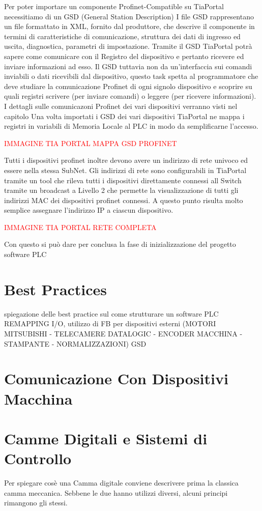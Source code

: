 \documentclass[12pt, a4paper, oneside]{book}
\begin{document}
	Per poter importare un componente Profinet-Compatible su TiaPortal necessitiamo di un GSD (General Station Description) 
	I file GSD rappresentano un file formattato in XML, fornito dal produttore, che descrive il componente in termini di caratteristiche di comunicazione, struttura dei dati di ingresso ed uscita, diagnostica, parametri di impostazione. Tramite il GSD TiaPortal potrà sapere come comunicare con il Registro del dispositivo e pertanto ricevere ed inviare informazioni ad esso. Il GSD tuttavia non da un'interfaccia sui comandi inviabili o dati ricevibili dal dispositivo, questo task spetta al programmatore che deve studiare la comunicazione Profinet di ogni signolo dispositivo e scoprire su quali registri scrivere (per inviare comandi) o leggere (per ricevere informazioni). I dettagli sulle comunicazoni Profinet dei vari dispositivi verranno visti nel capitolo \cite{profinet}
	Una volta importati i GSD dei vari dispositivi TiaPortal ne mappa i registri in variabili di Memoria Locale al PLC in modo da semplificarne l'accesso. 
	
	\textcolor{red}{IMMAGINE TIA PORTAL MAPPA GSD PROFINET}
	
	Tutti i dispositivi profinet inoltre devono avere un indirizzo di rete univoco ed essere nella stessa SubNet. Gli indirizzi di rete sono configurabili in TiaPortal tramite un tool che rileva tutti i dispositivi direttamente connessi all Switch tramite un broadcast a Livello 2 che permette la visualizzazione di tutti gli indirizzi MAC dei dispositivi profinet connessi. A questo punto risulta molto semplice assegnare l'indirizzo IP a ciascun dispositivo.
	
	\textcolor{red}{IMMAGINE TIA PORTAL RETE COMPLETA}
	
	Con questo si può dare per conclusa la fase di inizializzazione del progetto software PLC

\section{Best Practices}
spiegazione delle best practice sul come strutturare un software PLC REMAPPING I/O, utilizzo di FB per dispositivi esterni (MOTORI MITSUBISHI - TELECAMERE DATALOGIC - ENCODER MACCHINA - STAMPANTE - NORMALIZZAZIONI) GSD
\section{Comunicazione Con Dispositivi Macchina}

\section{Camme Digitali e Sistemi di Controllo}
Per spiegare cosè una Camma digitale conviene descrivere prima la classica camma meccanica. Sebbene le due hanno utilizzi diversi, alcuni principi rimangono gli stessi.
\end{document}
